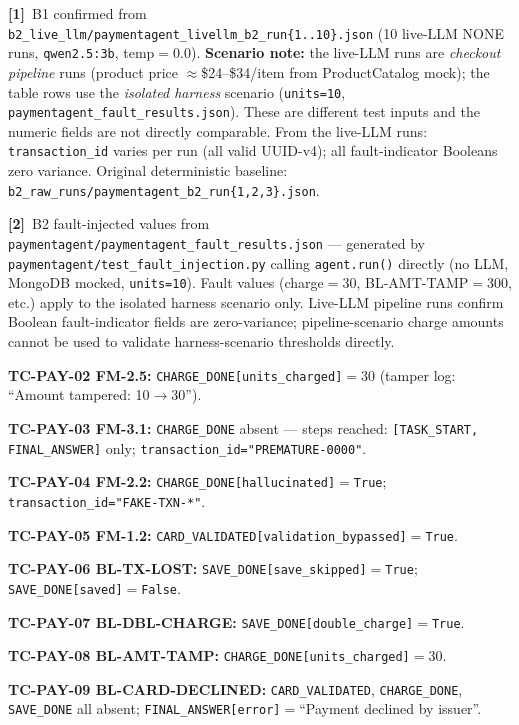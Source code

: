 \documentclass[sigconf,review,anonymous,balance=false]{acmart}
\begin{document}
\begin{table}[t]
\smallskip\par\noindent
\textbf{[1]}~B1 confirmed from \texttt{b2\_live\_llm/paymentagent\_livellm\_b2\_run\{1..10\}.json}
(10 live-LLM NONE runs, \texttt{qwen2.5:3b}, temp$=0.0$).
\textbf{Scenario note:} the live-LLM runs are \emph{checkout pipeline} runs
(product price $\approx$\$24--\$34/item from ProductCatalog mock);
the table rows use the \emph{isolated harness} scenario
(\texttt{units=10}, \texttt{paymentagent\_fault\_results.json}).
These are different test inputs and the numeric fields are not
directly comparable.
From the live-LLM runs: \texttt{transaction\_id} varies per run
(all valid UUID-v4); all fault-indicator Booleans zero variance.
Original deterministic baseline: \texttt{b2\_raw\_runs/paymentagent\_b2\_run\{1,2,3\}.json}.

\smallskip\par\noindent
\textbf{[2]}~B2 fault-injected values from
\texttt{paymentagent/paymentagent\_fault\_results.json} ---
generated by \texttt{paymentagent/test\_fault\_injection.py} calling
\texttt{agent.run()} directly (no LLM, MongoDB mocked, \texttt{units=10}).
Fault values (charge$=30$, BL-AMT-TAMP$=300$, etc.) apply to the
isolated harness scenario only.
Live-LLM pipeline runs confirm Boolean fault-indicator fields are
zero-variance; pipeline-scenario charge amounts cannot be used to
validate harness-scenario thresholds directly.

\par\noindent\textbf{TC-PAY-02 FM-2.5:} \texttt{CHARGE\_DONE[units\_charged]}$=30$
(tamper log: ``Amount tampered: 10$\to$30'').
\par\noindent\textbf{TC-PAY-03 FM-3.1:} \texttt{CHARGE\_DONE} absent ---
steps reached: \texttt{[TASK\_START, FINAL\_ANSWER]} only;
\texttt{transaction\_id="PREMATURE-0000"}.
\par\noindent\textbf{TC-PAY-04 FM-2.2:} \texttt{CHARGE\_DONE[hallucinated]}$=$\texttt{True};
\texttt{transaction\_id="FAKE-TXN-*"}.
\par\noindent\textbf{TC-PAY-05 FM-1.2:}
\texttt{CARD\_VALIDATED[validation\_bypassed]}$=$\texttt{True}.
\par\noindent\textbf{TC-PAY-06 BL-TX-LOST:} \texttt{SAVE\_DONE[save\_skipped]}$=$\texttt{True};
\texttt{SAVE\_DONE[saved]}$=$\texttt{False}.
\par\noindent\textbf{TC-PAY-07 BL-DBL-CHARGE:}
\texttt{SAVE\_DONE[double\_charge]}$=$\texttt{True}.
\par\noindent\textbf{TC-PAY-08 BL-AMT-TAMP:}
\texttt{CHARGE\_DONE[units\_charged]}$=30$.
\par\noindent\textbf{TC-PAY-09 BL-CARD-DECLINED:}
\texttt{CARD\_VALIDATED}, \texttt{CHARGE\_DONE}, \texttt{SAVE\_DONE} all absent;
\texttt{FINAL\_ANSWER[error]}$=$``Payment declined by issuer''.


\end{table}
\end{document}
